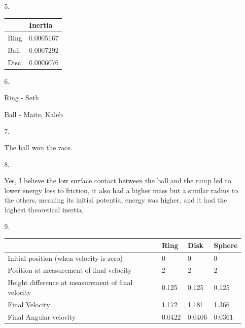 \begin{itemize}
        \item[5.]~\\
        
        \begin{center}
            \begin{tabular}{l | l}
                & Inertia                   \\ \hline
                Ring        & 0.0005167  \\ \hline
                Ball        & 0.0007292  \\ \hline
                Disc        & 0.0006076
            \end{tabular}
        \end{center}

        \item[6.]
        
        Ring - Seth

        Ball - Maite, Kaleb

        \item[7.]
        
        The ball won the race.

        \item[8.]
        
        Yes, I believe the low surface contact between the ball and the ramp led to lower energy loss to friction, it also had a higher mass but a similar radius to the others, meaning its initial potential energy was higher, and it had the highest theoretical inertia.

        \item[9.]
        
        \begin{center}
            \begin{tabular}{|l|l|l|l|}
            \hline
                 & Ring & Disk & Sphere \\ \hline
                Initial position (when velocity is zero) & 0 & 0 & 0 \\ \hline
                Position at measurement of final velocity & 2 & 2 & 2 \\ \hline
                Height difference at measurement of final velocity & 0.125 & 0.125 & 0.125 \\ \hline
                Final Velocity & 1.172 & 1.181 & 1.366 \\ \hline
                Final Angular velocity & 0.0422 & 0.0406 & 0.0361 \\ \hline
            \end{tabular}
        \end{center}


\end{itemize}
